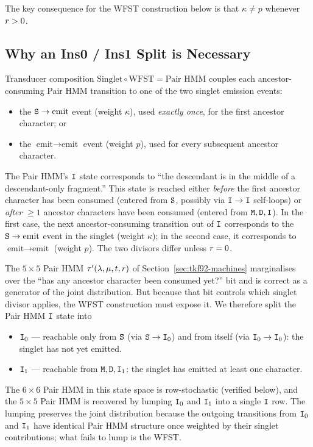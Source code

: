 The key consequence for the WFST construction below is that
$\kappa \neq p$ whenever $r > 0$.

\subsection{Why an Ins0 / Ins1 Split is Necessary}
\label{sec:wfst92-i0i1-split}

Transducer composition $\text{Singlet} \circ \text{WFST} = \text{Pair HMM}$
couples each ancestor-consuming Pair HMM transition to one of the two
singlet emission events:
\begin{itemize}[nosep]
\item the ${\tt S}\to\text{emit}$ event (weight $\kappa$), used \emph{exactly once},
  for the first ancestor character; or
\item the $\text{emit}\to\text{emit}$ event (weight $p$), used for every
  subsequent ancestor character.
\end{itemize}
The Pair HMM's ${\tt I}$ state corresponds to ``the descendant is in the
middle of a descendant-only fragment.''  This state is reached either
\emph{before} the first ancestor character has been consumed (entered
from ${\tt S}$, possibly via ${\tt I}\to{\tt I}$ self-loops) or \emph{after}
$\geq 1$ ancestor characters have been consumed (entered from
${\tt M},{\tt D},{\tt I}$).  In the first case, the next ancestor-consuming
transition out of ${\tt I}$ corresponds to the ${\tt S}\to\text{emit}$
event in the singlet (weight $\kappa$); in the second case, it
corresponds to $\text{emit}\to\text{emit}$ (weight $p$).
The two divisors differ unless $r=0$.

The $5{\times}5$ Pair HMM
$\tau'(\lambda,\mu,t,r)$ of
Section~\ref{sec:tkf92-machines} marginalises over the
``has any ancestor character been consumed yet?'' bit and is correct
as a generator of the joint distribution.  But because that bit
controls which singlet divisor applies, the WFST construction must
expose it.  We therefore split the Pair HMM ${\tt I}$ state into
\begin{itemize}[nosep]
\item ${\tt I}_0$ --- reachable only from ${\tt S}$ (via ${\tt S}\to{\tt I}_0$) and from itself
  (via ${\tt I}_0\to{\tt I}_0$): the singlet has not yet emitted.
\item ${\tt I}_1$ --- reachable from ${\tt M},{\tt D},{\tt I}_1$: the singlet has emitted
  at least one character.
\end{itemize}
The $6{\times}6$ Pair HMM in this state space is row-stochastic
(verified below), and the $5{\times}5$ Pair HMM is recovered by lumping
${\tt I}_0$ and ${\tt I}_1$ into a single ${\tt I}$ row.  The lumping preserves
the joint distribution because the outgoing transitions from ${\tt I}_0$
and ${\tt I}_1$ have identical Pair HMM structure once weighted by their
singlet contributions; what fails to lump is the WFST.

